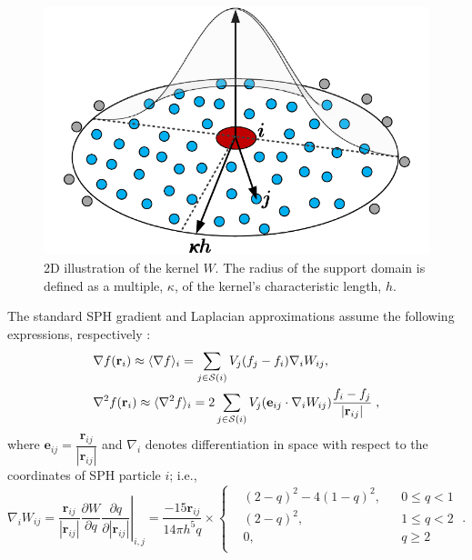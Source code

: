 \begin{figure}[H]
	\begin{center}
		\includegraphics[width=.5\linewidth]{images/sph_kernel.png}
	\end{center}
	\caption{2D illustration of the kernel $W$. The radius of the support domain is defined as a multiple, $\kappa$, of the kernel's characteristic length, $h$.}
	\label{fig:SPH}
\end{figure}


The standard SPH gradient and Laplacian approximations assume the following expressions, respectively \cite{Monaghan2005a}:
\begin{align}
&\nabla f(\mathbf r_i) \approx \langle \nabla f \rangle_i=\sum_{j \in {{\mathcal{S}({i})}}} V_j (f_j-f_i) \nabla_i W_{ij}\label{eq:Standard_G},\\
&\nabla^2 f(\mathbf r_i) \approx \langle \nabla^2 f \rangle_i=2\sum_{j \in {{\mathcal{S}({i})}}} V_j ( \mathbf{e}_{ij} \cdot \nabla_i W_{ij}) \frac{f_i-f_j}{|\mathbf{r}_{ij}|} \; , \label{eq:Standard_L}
\end{align}
where $\mathbf{e}_{ij}=\dfrac{\mathbf{r}_{ij}}{|\mathbf{r}_{ij}|}$ and $\nabla_i$ denotes differentiation in space with respect to the coordinates of SPH particle $i$; i.e., 
\begin{equation}
\label{eq:nablaW}
\nabla_i W_{ij} =\left.\frac{\mathbf r_{ij}}{|\mathbf r_{ij}|} \frac{\partial W}{\partial q} \frac{\partial q}{\partial |\mathbf r_{ij}|}\right\vert_{i,j} =  \frac{-15{\mathbf r}_{ij}}{{14\pi {h^5}q}} \times \left\{ \begin{aligned}
&{(2 - q)^2} - 4{(1 - q)^2}, && 0 \le q < 1 \\ 
&(2 - q)^2, && 1 \le q < 2 \\ 
&0, && q \ge 2 \\ 
\end{aligned} \right.\; .
\end{equation}

